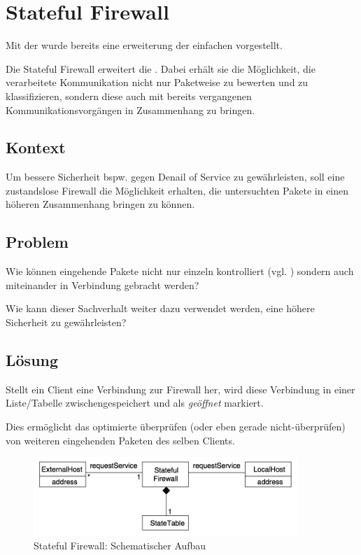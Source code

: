 \section{Stateful Firewall}
Mit der  wurde bereits eine erweiterung der einfachen  vorgestellt.

Die Stateful Firewall erweitert die . Dabei erhält sie die Möglichkeit, die verarbeitete Kommunikation nicht nur Paketweise zu bewerten und zu klassifizieren, sondern diese auch mit bereits vergangenen Kommunikationsvorgängen in Zusammenhang zu bringen.

\subsection*{Kontext}
Um bessere Sicherheit bspw. gegen Denail of Service \cite{DoS} zu gewährleisten, soll eine zustandslose Firewall die Möglichkeit erhalten, die untersuchten Pakete in einen höheren Zusammenhang bringen zu können.

\subsection*{Problem}
Wie können eingehende Pakete nicht nur einzeln kontrolliert (vgl. ) sondern auch miteinander in Verbindung gebracht werden?

Wie kann dieser Sachverhalt weiter dazu verwendet werden, eine höhere Sicherheit zu gewährleisten?


\subsection*{Lösung}
Stellt ein Client eine Verbindung zur Firewall her, wird diese Verbindung in einer Liste/Tabelle zwischengespeichert und als \emph{geöffnet} markiert.

Dies ermöglicht das optimierte überprüfen (oder eben gerade nicht-überprüfen) von weiteren eingehenden Paketen des selben Clients.

\begin{figure}[H]
	\includegraphics[width=10cm]{content/firewall-architectures/images/stateful-structure.png}
	\caption{Stateful Firewall: Schematischer Aufbau}
\end{figure}

